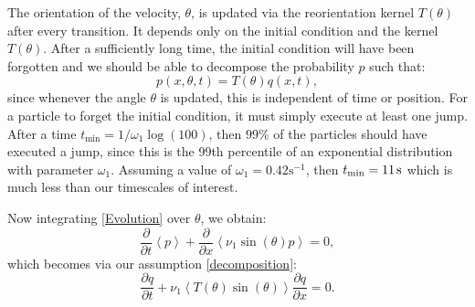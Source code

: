 \documentclass[twocolumn]{biophys}
\def\mean#1{\left< #1 \right>}
\begin{document}
The orientation of the velocity, $\theta$, is updated via the reorientation kernel $T(\theta)$ after every transition.
It depends only on the initial condition and the kernel $T(\theta)$.
After a sufficiently long time, the initial condition will have been forgotten and we should be able to decompose the probability $p$ such that:
\begin{equation}\label{decomposition}
 p(x,\theta , t) = T(\theta) q(x,t),
\end{equation}
since whenever the angle $\theta$ is updated, this is independent of time or position. 
For a particle to forget the initial condition, it must simply execute at least one jump. 
After a time $t_{\text{min}} = 1/\omega_1 \log (100)$, then $99\%$ of the particles should have executed a jump, since this is the 99th percentile of an exponential distribution with parameter $\omega_1$.
Assuming a value of $\omega_1 = 0.42 \text{s}^{-1}$, then $t_{\text{min}} = 11 \hspace{0.5mm} \text{s}$ which is much less than our timescales of interest. 

Now integrating \eqref{Evolution} over $\theta$, we obtain:
\begin{equation}
 \frac{\partial}{\partial t} \mean{p} + \frac{\partial}{\partial x} \mean{\nu_1 \sin(\theta) p} = 0,
\end{equation}
which becomes via our assumption \eqref{decomposition}: 
\begin{equation}
 \frac{\partial q}{\partial t} + \nu_1 \mean{T(\theta) \sin(\theta)} \frac{\partial q}{\partial x} = 0.
\end{equation}
\end{document}
